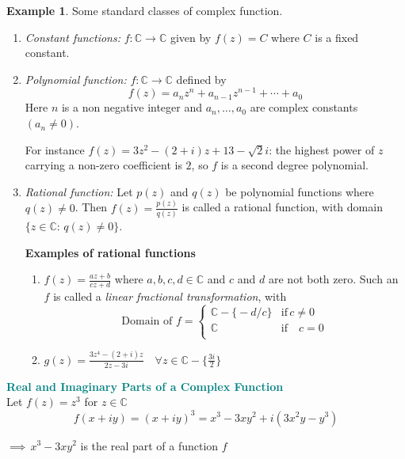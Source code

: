 \documentclass[11pt,a4paper]{article}
\theoremstyle{definition}
\newtheorem{example}[thm]{Example}
\newcommand{\subhead}[1]{%
  \par\medskip\noindent\textbf{#1}\par\nobreak\smallskip}
\begin{document}
\begin{example}
Some standard classes of complex function.
\begin{enumerate}
\item \textit{Constant functions:} $f: \mathbb{C}\longrightarrow \mathbb{C}$ given by $f(z)  = C$ where $C$ is a fixed constant.

\item \textit{Polynomial function:} $f: \mathbb{C}\longrightarrow \mathbb{C}$ defined by $$f(z) = a_n z^n + a_{n - 1}z^{n - 1} + \cdots + a_0$$ Here $n$ is a non negative integer and $a_n , \ldots, a_0$ are complex constants $(a_n\neq 0)$.

For instance $f(z ) = 3z^2 - (2 + i)z + 13 - \sqrt{2}i$: the highest power of
$z$ carrying a non-zero coefficient is $2$, so $f$ is a second degree
polynomial.

\item \textit{Rational function:} Let $p(z)$ and $q(z)$ be polynomial functions where $q(z) \neq 0$. Then $f(z) = \frac{p(z)}{q(z)}$ is called a rational function, with domain $\{z\in \mathbb{C}:\,q(z)\neq 0\}$.

\subhead{Examples of rational functions}
\begin{enumerate}
\item $f(z) = \frac{az + b}{cz + d}$ where $a, b, c, d\in \mathbb{C}$ and $c$ and $d$ are not both zero. Such an $f$ is called a \emph{linear fractional transformation}, with
$$\text{Domain of } f= \begin{cases}
\mathbb{C} - \big\{-d/c\big\} & \text{if}\, c\neq 0\\
\mathbb{C} & \text{if}\quad  c = 0\\
\end{cases}$$

\item $g(z) = \frac{3z^4 - (2 + i)z}{2z - 3i}\quad \forall z \in \mathbb{C} - \Big\{\frac{3i}{2}\Big\}$
\end{enumerate}
\end{enumerate}
\end{example}





\textbf{\textcolor{teal}{Real and Imaginary Parts of a Complex Function}}\\

Let $f(z) = z^3$ for $z \in \mathbb{C}$
$$f(x + iy) = (x + iy)^3 = x^3 - 3xy^2 + i(3x^2y - y^3)$$

$\implies \, x^3 - 3xy^2$ is the real part of a function $f$\\
\end{document}
